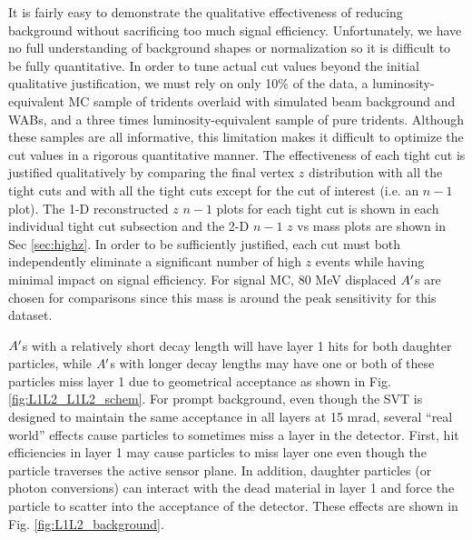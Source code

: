 It is fairly easy to demonstrate the qualitative effectiveness of reducing background without sacrificing too much signal efficiency. Unfortunately, we have no full understanding of background shapes or normalization so it is difficult to be fully quantitative. In order to tune actual cut values beyond the initial qualitative justification, we must rely on only 10\% of the data, a luminosity-equivalent MC sample of tridents overlaid with simulated beam background and WABs, and a three times luminosity-equivalent sample of pure tridents. Although these samples are all informative, this limitation makes it difficult to optimize the cut values in a rigorous quantitative manner. The effectiveness of each tight cut is justified qualitatively by comparing the final vertex $z$ distribution with all the tight cuts and with all the tight cuts except for the cut of interest (i.e. an $n-1$ plot). The 1-D reconstructed $z$ $n-1$ plots for each tight cut is shown in each individual tight cut subsection and the 2-D $n-1$ $z$ vs mass plots are shown in Sec \ref{sec:highz}. In order to be sufficiently justified, each cut must both independently eliminate a significant number of high $z$ events while having minimal impact on signal efficiency. For signal MC, 80 MeV displaced $A^\prime$s are chosen for comparisons since this mass is around the peak sensitivity for this dataset. %

$A^\prime$s with a relatively short decay length will have layer 1 hits for both daughter particles, while $A^\prime$s with longer decay lengths may have one or both of these particles miss layer 1 due to geometrical acceptance as shown in Fig. \ref{fig:L1L2_L1L2_schem}. For prompt background, even though the SVT is designed to maintain the same acceptance in all layers at 15 mrad, several ``real world'' effects cause particles to sometimes miss a layer in the detector. First, hit efficiencies in layer 1 may cause particles to miss layer one even though the particle traverses the active sensor plane. In addition, daughter particles (or photon conversions) can interact with the dead material in layer 1 and force the particle to scatter into the acceptance of the detector. These effects are shown in Fig. \ref{fig:L1L2_background}.


